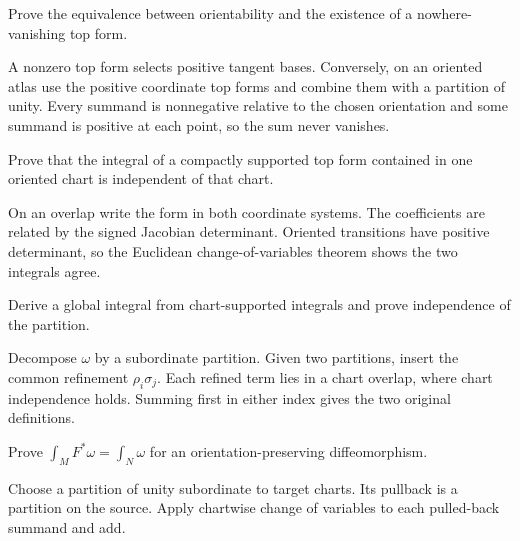 \begin{problem}\label{prob:vii10-02}
Prove the equivalence between orientability and the existence of a nowhere-vanishing top form.
\end{problem}
\begin{solution}
A nonzero top form selects positive tangent bases. Conversely, on an oriented atlas use the positive coordinate top forms and combine them with a partition of unity. Every summand is nonnegative relative to the chosen orientation and some summand is positive at each point, so the sum never vanishes.
\end{solution}

\begin{problem}\label{prob:vii10-03}
Prove that the integral of a compactly supported top form contained in one oriented chart is independent of that chart.
\end{problem}
\begin{solution}
On an overlap write the form in both coordinate systems. The coefficients are related by the signed Jacobian determinant. Oriented transitions have positive determinant, so the Euclidean change-of-variables theorem shows the two integrals agree.
\end{solution}

\begin{problem}\label{prob:vii10-04}
Derive a global integral from chart-supported integrals and prove independence of the partition.
\end{problem}
\begin{solution}
Decompose $\omega$ by a subordinate partition. Given two partitions, insert the common refinement $\rho_i\sigma_j$. Each refined term lies in a chart overlap, where chart independence holds. Summing first in either index gives the two original definitions.
\end{solution}

\begin{problem}\label{prob:vii10-05}
Prove $\int_MF^*\omega=\int_N\omega$ for an orientation-preserving diffeomorphism.
\end{problem}
\begin{solution}
Choose a partition of unity subordinate to target charts. Its pullback is a partition on the source. Apply chartwise change of variables to each pulled-back summand and add.
\end{solution}

